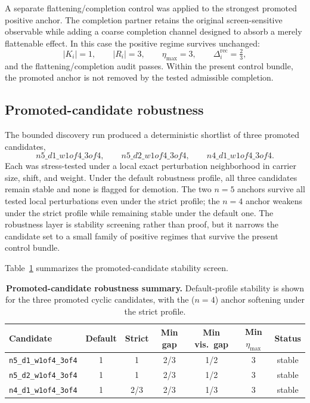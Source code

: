 \documentclass[11pt]{article}
\theoremstyle{definition}
\begin{document}
A separate flattening/completion control was applied to the strongest promoted positive anchor. The completion partner retains the original screen-sensitive observable while adding a coarse completion channel designed to absorb a merely flattenable effect. In this case the positive regime survives unchanged:
\[
|K_i| = 1, \qquad |R_i| = 3, \qquad \eta_{\max} = 3, \qquad \Delta_i^{\mathrm{rec}} = \tfrac23,
\]
and the flattening/completion audit passes. Within the present control bundle, the promoted anchor is not removed by the tested admissible completion.

\subsection{Promoted-candidate robustness}

The bounded discovery run produced a deterministic shortlist of three promoted candidates,
\[
n5\_d1\_w1of4\_3of4,\qquad
n5\_d2\_w1of4\_3of4,\qquad
n4\_d1\_w1of4\_3of4.
\]
Each was stress-tested under a local exact perturbation neighborhood in carrier size, shift, and weight. Under the default robustness profile, all three candidates remain stable and none is flagged for demotion. The two \(n=5\) anchors survive all tested local perturbations even under the strict profile; the \(n=4\) anchor weakens under the strict profile while remaining stable under the default one. The robustness layer is stability screening rather than proof, but it narrows the candidate set to a small family of positive regimes that survive the present control bundle.

Table~\ref{tab:robustness-shortlist} summarizes the promoted-candidate stability screen.
\begin{table}[t]
\centering
\small
\caption{\textbf{Promoted-candidate robustness summary.} Default-profile stability is shown for the three promoted cyclic candidates, with the ($n=4$) anchor softening under the strict profile.}
\label{tab:robustness-shortlist}
\begin{tabular}{lcccccc}
\toprule
Candidate & Default & Strict & Min gap & Min vis.\ gap & Min $\eta_{\max}$ & Status \\
\midrule
        \texttt{n5\_d1\_w1of4\_3of4} & 1 & 1 & 2/3 & 1/2 & 3 & stable \\
        \texttt{n5\_d2\_w1of4\_3of4} & 1 & 1 & 2/3 & 1/2 & 3 & stable \\
        \texttt{n4\_d1\_w1of4\_3of4} & 1 & 2/3 & 2/3 & 1/3 & 3 & stable \\
\bottomrule
\end{tabular}
\end{table}
 
\end{document}
